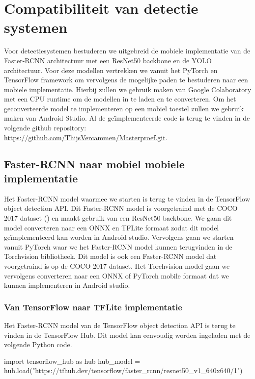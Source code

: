\chapter{Compatibiliteit van detectie systemen}
Voor detectiesystemen bestuderen we uitgebreid de mobiele implementatie van de Faster-RCNN architectuur met een ResNet50 backbone en de YOLO architectuur.
Voor deze modellen vertrekken we vanuit het PyTorch en TensorFlow framework om vervolgens de mogelijke paden te bestuderen naar een mobiele implementatie.
Hierbij zullen we gebruik maken van Google Colaboratory met een CPU runtime om de modellen in te laden en te converteren.
Om het geconverteerde model te implementeren op een mobiel toestel zullen we gebruik maken van Android Studio.
Al de ge\"implementeerde code is terug te vinden in de volgende github repository: \url{https://github.com/ThijsVercammen/Masterproef.git}.

\section{Faster-RCNN naar mobiel mobiele implementatie}
Het Faster-RCNN model waarmee we starten is terug te vinden in de TensorFlow object detection API.
Dit Faster-RCNN model is voorgetraind met de COCO 2017 dataset (\cite{lin2015microsoft}) en maakt gebruik van een ResNet50 backbone.
We gaan dit model converteren naar een ONNX en TFLite formaat zodat dit model ge\"implementeerd kan worden in Android studio.
Vervolgens gaan we starten vanuit PyTorch waar we het Faster-RCNN model kunnen terugvinden in de Torchvision bibliotheek.
Dit model is ook een Faster-RCNN model dat voorgetraind is op de COCO 2017 dataset.
Het Torchvision model gaan we vervolgens converteren naar een ONNX of PyTorch mobile formaat dat we kunnen implementeren in Android studio.

\subsection{Van TensorFlow naar TFLite implementatie} \label{rcnn_tf}
Het Faster-RCNN model van de TensorFlow object detection API is terug te vinden in de TensorFlow Hub.
Dit model kan eenvoudig worden ingeladen met de volgende Python code.

\begin{python}
import tensorflow_hub as hub
hub_model = hub.load("https://tfhub.dev/tensorflow/faster_rcnn/resnet50_v1_640x640/1")
\end{python}

